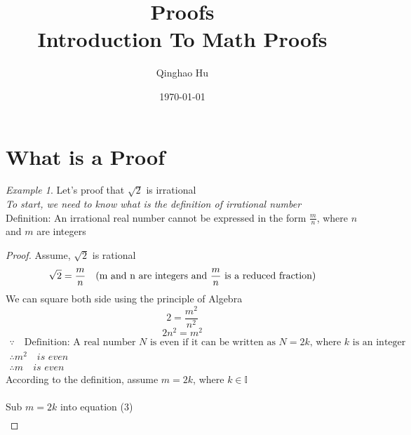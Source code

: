 \documentclass[11pt]{article}
\title{\textbf{Proofs} \\ \large Introduction To Math Proofs}
\author{Qinghao Hu}
\date{\today}
\theoremstyle{remark}
\newtheorem*{example}{Example}
\begin{document}
\maketitle
\newpage
\tableofcontents
\newpage

\section{What is a Proof}
\begin{example}
	Let's proof that $\sqrt{2}$ is irrational\\
	\indent\textit{To start, we need to know what is the definition of irrational number} \\
	\indent Definition: An irrational real number cannot be expressed in the form $\frac{m}{n}$, where $n$ and $m$ are integers \\
	\begin{proof}
		Assume, $\sqrt{2}$ is rational \\
		\begin{equation}
			\sqrt{2} = {m \over n} \quad \text{(m and n are integers and $\frac{m}{n}$ is a reduced fraction)}
		\end{equation}
		We can square both side using the principle of Algebra \\
		\begin{equation}
			2 = \frac{m^2}{n^2} 
		\end{equation}
		\begin{equation}
			2n^2 = m^2
		\end{equation}
		\begin{gather}
		\because \quad \text{Definition: A real number $N$ is even if it can be written as $N = 2k$, where $k$ is an integer}\\
		\therefore m^2 \quad\textit{is even} \\
		\therefore m \quad\textit{is even}
		\end{gather}
		According to the definition, assume $m = 2k$, where $k \in \mathbb{I}$ \\
		\\
		Sub $m = 2k$ into equation (3)
		\begin{gather}

\end{gather}
\end{proof}
\end{example}
\end{document}
